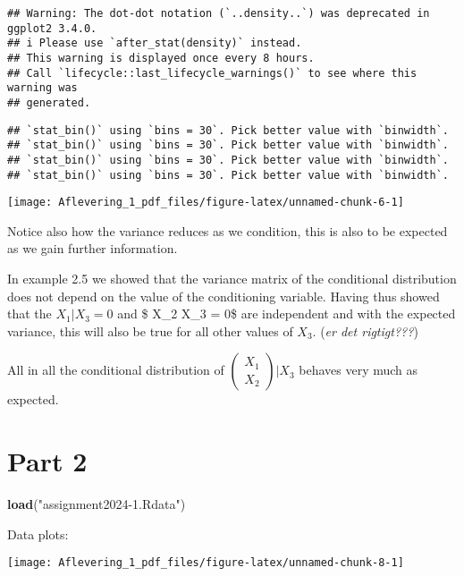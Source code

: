 \documentclass[
]{article}
\newenvironment{Shaded}{\begin{snugshade}}{\end{snugshade}}
\newcommand{\FunctionTok}[1]{\textcolor[rgb]{0.13,0.29,0.53}{\textbf{#1}}}
\newcommand{\NormalTok}[1]{#1}
\newcommand{\StringTok}[1]{\textcolor[rgb]{0.31,0.60,0.02}{#1}}
\begin{document}
\begin{verbatim}
## Warning: The dot-dot notation (`..density..`) was deprecated in ggplot2 3.4.0.
## i Please use `after_stat(density)` instead.
## This warning is displayed once every 8 hours.
## Call `lifecycle::last_lifecycle_warnings()` to see where this warning was
## generated.
\end{verbatim}

\begin{verbatim}
## `stat_bin()` using `bins = 30`. Pick better value with `binwidth`.
## `stat_bin()` using `bins = 30`. Pick better value with `binwidth`.
## `stat_bin()` using `bins = 30`. Pick better value with `binwidth`.
## `stat_bin()` using `bins = 30`. Pick better value with `binwidth`.
\end{verbatim}

\begin{center}\texttt{[image: Aflevering\_1\_pdf\_files/figure-latex/unnamed-chunk-6-1]} \end{center}

Notice also how the variance reduces as we condition, this is also to be
expected as we gain further information.

In example 2.5 we showed that the variance matrix of the conditional
distribution does not depend on the value of the conditioning variable.
Having thus showed that the \(X_1| X_3 = 0\) and \$ X\_2 \textbar{} X\_3
= 0\$ are independent and with the expected variance, this will also be
true for all other values of \(X_3\). (\emph{er det rigtigt???})

All in all the conditional distribution of
\(\begin{pmatrix} X_1 \\ X_2 \end{pmatrix} \vert X_3\) behaves very much
as expected.

\section{Part 2}\label{part-2}

\begin{Shaded}
\begin{Highlighting}[]
\FunctionTok{load}\NormalTok{(}\StringTok{"assignment2024{-}1.Rdata"}\NormalTok{)}
\end{Highlighting}
\end{Shaded}

Data plots:

\begin{center}\texttt{[image: Aflevering\_1\_pdf\_files/figure-latex/unnamed-chunk-8-1]} \end{center}
\end{document}
